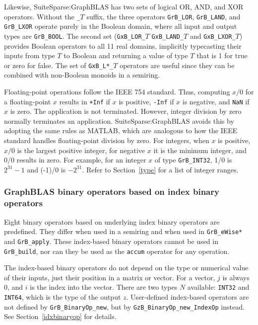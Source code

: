 \documentclass[12pt]{article}
\begin{document}
Likewise, SuiteSparse:GraphBLAS has two sets of logical OR, AND, and XOR
operators.  Without the \verb'_'$T$ suffix, the three operators \verb'GrB_LOR',
\verb'GrB_LAND', and \verb'GrB_LXOR' operate purely in the Boolean domain,
where all input and output types are \verb'GrB_BOOL'.  The second set
(\verb'GxB_LOR_'$T$ \verb'GxB_LAND_'$T$ and \verb'GxB_LXOR_'$T$) provides
Boolean operators to all 11 real domains, implicitly typecasting their inputs from
type $T$ to Boolean and returning a value of type $T$ that is 1 for true or
zero for false.  The set of \verb'GxB_L*_'$T$ operators are useful since they
can be combined with non-Boolean monoids in a semiring.

Floating-point operations follow the IEEE 754 standard.  Thus, computing $x/0$
for a floating-point $x$ results in \verb'+Inf' if $x$ is positive, \verb'-Inf'
if $x$ is negative, and \verb'NaN' if $x$ is zero.  The application is not
terminated.  However, integer division by zero normally terminates an
application.  SuiteSparse:GraphBLAS avoids this by adopting the same rules as
MATLAB, which are analogous to how the IEEE standard handles floating-point
division by zero.  For integers, when $x$ is positive, $x/0$ is the largest
positive integer, for negative $x$ it is the minimum integer, and 0/0 results
in zero.  For example, for an integer $x$ of type \verb'GrB_INT32', 1/0 is
$2^{31}-1$ and (-1)/0 is $-2^{31}$.  Refer to Section~\ref{type} for a list of
integer ranges.

\subsubsection{GraphBLAS binary operators based on index binary operators}

Eight binary operators based on underlying index binary operators are
predefined.  They differ when used in a semiring and when used in
\verb'GrB_eWise*' and \verb'GrB_apply'.  These index-based binary operators
cannot be used in \verb'GrB_build', nor can they be used as the \verb'accum'
operator for any operation.

The index-based binary operators do not depend on the type or numerical value
of their inputs, just their position in a matrix or vector.  For a vector, $j$
is always 0, and $i$ is the index into the vector.  There are two types $N$
available: \verb'INT32' and \verb'INT64', which is the type of the output $z$.
User-defined index-based operators are not defined by \verb'GrB_BinaryOp_new',
but by \verb'GzB_BinaryOp_new_IndexOp' instead.  See Section~\ref{idxbinaryop}
for details.
\end{document}
